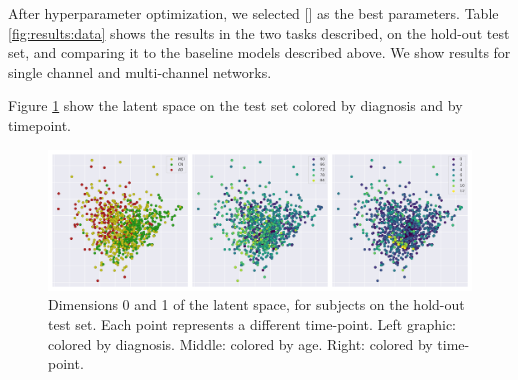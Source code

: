 After hyperparameter optimization, we selected [] as the best parameters.  Table \ref{fig:results:data} shows the results in the two tasks described, on the hold-out test set, and comparing it to the baseline models described above. We show results for single channel and multi-channel networks.

\begin{table}[!htbp]
\centering
{}
\caption[Performance of the model.]{Performance of the models on longitudinal prediction and channel reconstruction, compared to baseline methods. RNN-VAE: single channel model.  MC-RVAE: multiple channel model. All values are mean absolute error (MAE) over each subject and time-point.} \label{table:results:data}
\end{table}

Figure \ref{fig:rnn:latent} show the latent space on the test set colored by diagnosis and by timepoint. \\

\begin{figure}[!htbp]
  \centering
  \includegraphics[width=1.0\textwidth]{figures/rnnvae/latent_space_fig.png}
  \caption[Latent space for the test set.]{Dimensions 0 and 1 of the latent space, for subjects on the hold-out test set. Each point represents a different time-point. Left graphic: colored by diagnosis. Middle: colored by age. Right: colored by time-point.}\label{fig:rnn:latent}
\end{figure}

